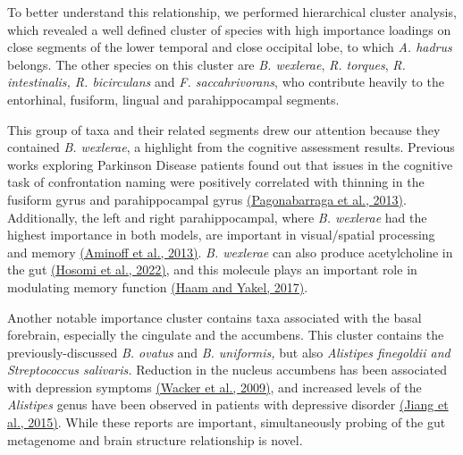 To better understand this relationship, we performed hierarchical
cluster analysis, which revealed a well defined cluster of species with
high importance loadings on close segments of the lower temporal and
close occipital lobe, to which \emph{A. hadrus} belongs. The other
species on this cluster are \emph{B. wexlerae}, \emph{R. torques},
\emph{R. intestinalis, R. bicirculans} and \emph{F. saccahrivorans}, who
contribute heavily to the entorhinal, fusiform, lingual and
parahippocampal segments.

This group of taxa and their related segments drew our attention because
they contained \emph{B. wexlerae}, a highlight from the cognitive
assessment results. Previous works exploring Parkinson Disease patients
found out that issues in the cognitive task of confrontation naming were
positively correlated with thinning in the fusiform gyrus and
parahippocampal gyrus
\href{https://www.zotero.org/google-docs/?rlO6eq}{(Pagonabarraga et al.,
2013)}. Additionally, the left and right parahippocampal, where \emph{B.
wexlerae} had the highest importance in both models, are important in
visual/spatial processing and memory
\href{https://www.zotero.org/google-docs/?wkkWZT}{(Aminoff et al.,
2013)}. \emph{B. wexlerae} can also produce acetylcholine in the gut
\href{https://www.zotero.org/google-docs/?jBoxSm}{(Hosomi et al.,
2022)}, and this molecule plays an important role in modulating memory
function \href{https://www.zotero.org/google-docs/?BQ0j2c}{(Haam and
Yakel, 2017)}.

Another notable importance cluster contains taxa associated with the
basal forebrain, especially the cingulate and the accumbens. This
cluster contains the previously-discussed \emph{B. ovatus} and \emph{B.
uniformis,} but also \emph{Alistipes finegoldii and Streptococcus
salivaris.} Reduction in the nucleus accumbens has been associated with
depression symptoms
\href{https://www.zotero.org/google-docs/?2aSZIr}{(Wacker et al.,
2009)}, and increased levels of the \emph{Alistipes} genus have been
observed in patients with depressive disorder
\href{https://www.zotero.org/google-docs/?bhhSZB}{(Jiang et al., 2015)}.
While these reports are important, simultaneously probing of the gut
metagenome and brain structure relationship is novel.

